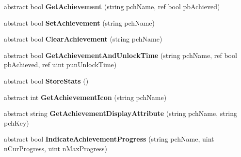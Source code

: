 \begin{DoxyCompactItemize}
abstract bool {\bfseries Get\+Achievement} (string pch\+Name, ref bool pb\+Achieved)
\item 
\mbox{\label{class_valve_1_1_steamworks_1_1_i_steam_user_stats_a3bbd88c980bd3ed961c740bb0042bc37}} 
abstract bool {\bfseries Set\+Achievement} (string pch\+Name)
\item 
\mbox{\label{class_valve_1_1_steamworks_1_1_i_steam_user_stats_a05e78c8f53931439eb6fd4b9380d4458}} 
abstract bool {\bfseries Clear\+Achievement} (string pch\+Name)
\item 
\mbox{\label{class_valve_1_1_steamworks_1_1_i_steam_user_stats_ad88d9243c1d1d6864115dc5e97d35064}} 
abstract bool {\bfseries Get\+Achievement\+And\+Unlock\+Time} (string pch\+Name, ref bool pb\+Achieved, ref uint pun\+Unlock\+Time)
\item 
\mbox{\label{class_valve_1_1_steamworks_1_1_i_steam_user_stats_a6f00aff74e8aaed7c2012125d251f1f0}} 
abstract bool {\bfseries Store\+Stats} ()
\item 
\mbox{\label{class_valve_1_1_steamworks_1_1_i_steam_user_stats_a5fc03f834ff2cafe2a959ed884b9cfae}} 
abstract int {\bfseries Get\+Achievement\+Icon} (string pch\+Name)
\item 
\mbox{\label{class_valve_1_1_steamworks_1_1_i_steam_user_stats_a6a328b426c8c4a58e1ed0b5526dde794}} 
abstract string {\bfseries Get\+Achievement\+Display\+Attribute} (string pch\+Name, string pch\+Key)
\item 
\mbox{\label{class_valve_1_1_steamworks_1_1_i_steam_user_stats_a4aac51c3e8c1dc3b919b28a7d1c193c9}} 
abstract bool {\bfseries Indicate\+Achievement\+Progress} (string pch\+Name, uint n\+Cur\+Progress, uint n\+Max\+Progress)
\item 
\mbox{\label{class_valve_1_1_steamworks_1_1_i_steam_user_stats_a3023cf638c7e1b8b92a6b3431b30ff30}} 

\end{DoxyCompactItemize}
